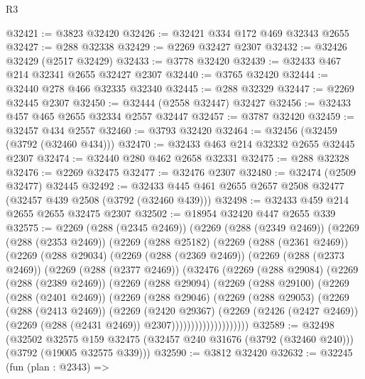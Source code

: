 \begin{lexlean}{R3}
\begin{coremodule}
@32421 := @3823 @32420
@32426 := @32421 @334 @172 @469 @32343 @2655
@32427 := @288 @32338
@32429 := @2269 @32427 @2307
@32432 := @32426 @32429 (@2517 @32429)
@32433 := @3778 @32420
@32439 := @32433 @467 @214 @32341 @2655 @32427 @2307
@32440 := @3765 @32420
@32444 := @32440 @278 @466 @32335 @32340
@32445 := @288 @32329
@32447 := @2269 @32445 @2307
@32450 := @32444 (@2558 @32447) @32427
@32456 := @32433 @457 @465 @2655 @32334 @2557 @32447
@32457 := @3787 @32420
@32459 := @32457 @434 @2557
@32460 := @3793 @32420
@32464 := @32456 (@32459 (@3792 (@32460 @434)))
@32470 := @32433 @463 @214 @32332 @2655 @32445 @2307
@32474 := @32440 @280 @462 @2658 @32331
@32475 := @288 @32328
@32476 := @2269 @32475
@32477 := @32476 @2307
@32480 := @32474 (@2509 @32477) @32445
@32492 := @32433 @445 @461 @2655 @2657 @2508 @32477 (@32457 @439 @2508 (@3792 (@32460 @439)))
@32498 := @32433 @459 @214 @2655 @2655 @32475 @2307
@32502 := @18954 @32420 @447 @2655 @339
@32575 := @2269
    (@288 (@2345 @2469))
    (@2269
      (@288 (@2349 @2469))
      (@2269
        (@288 (@2353 @2469))
        (@2269
          (@288 @25182)
          (@2269
            (@288 (@2361 @2469))
            (@2269
              (@288 @29034)
              (@2269
                (@288 (@2369 @2469))
                (@2269
                  (@288 (@2373 @2469))
                  (@2269
                    (@288 (@2377 @2469))
                    (@32476
                      (@2269
                        (@288 @29084)
                        (@2269
                          (@288 (@2389 @2469))
                          (@2269
                            (@288 @29094)
                            (@2269
                              (@288 @29100)
                              (@2269
                                (@288 (@2401 @2469))
                                (@2269
                                  (@288 @29046)
                                  (@2269
                                    (@288 @29053)
                                    (@2269
                                      (@288 (@2413 @2469))
                                      (@2269
                                        (@2420 @29367)
                                        (@2269
                                          (@2426 (@2427 @2469))
                                          (@2269 (@288 (@2431 @2469)) @2307))))))))))))))))))))
@32589 := @32498
    (@32502
      @32575
      @159
      @32475
      (@32457 @240 @31676 (@3792 (@32460 @240)))
      (@3792 (@19005 @32575 @339)))
@32590 := @3812 @32420
@32632 := @32245
    (fun (plan : @2343) =>

\end{coremodule}
\end{lexlean}
